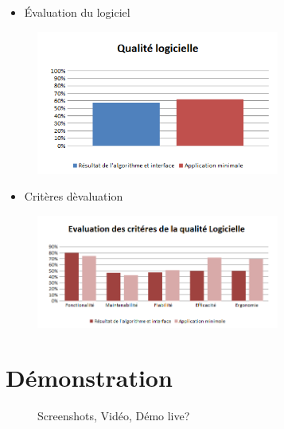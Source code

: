 \documentclass{beamer}
\begin{document}
	\begin{frame}{\secname}
		\begin{itemize}
			\item \'Evaluation du logiciel 
		\end{itemize}
		\begin{figure}
			\includegraphics[width=8cm]{Images/QualiteLogicielle.png}
		\end{figure}
	\end{frame}

	\begin{frame}{\secname}
		\begin{itemize}
			\item Crit\`eres d\`evaluation
		\end{itemize}
		\begin{figure}
			\includegraphics[width=8cm]{Images/EvaluationCriteres.png}
		\end{figure}
	\end{frame}



\section{Démonstration}

\begin{frame}{\secname}
	\begin{figure}
		Screenshots, Vidéo, Démo live?
	\end{figure}
\end{frame}
\end{document}
